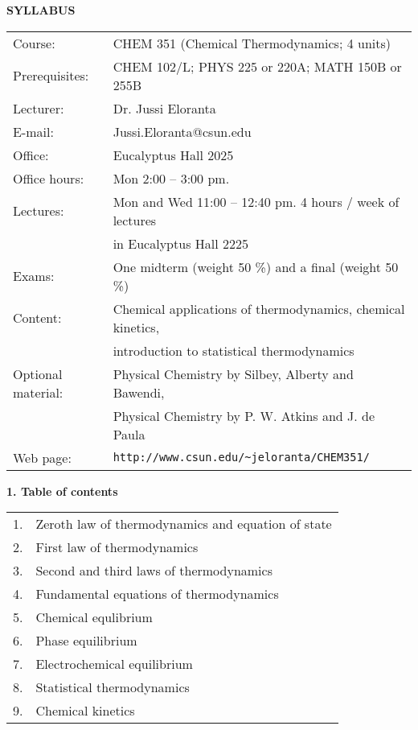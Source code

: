 \documentclass{report}
\begin{document}
\setlength{\parindent}{0pt}
\textbf{SYLLABUS}\\

\begin{tabular}{ll}
Course:   & CHEM 351 (Chemical Thermodynamics; 4 units)\\
Prerequisites: & CHEM 102/L; PHYS 225 or 220A; MATH 150B or 255B\\
Lecturer: & Dr. Jussi Eloranta\\
E-mail:	  & Jussi.Eloranta@csun.edu\\
Office:	  & Eucalyptus Hall 2025\\
Office hours: & Mon 2:00 -- 3:00 pm.\\
Lectures: & Mon and Wed 11:00 -- 12:40 pm. 4 hours / week of lectures\\
          & in Eucalyptus Hall 2225\\
Exams: & One midterm (weight 50 \%) and a final (weight 50 \%)\\
Content: & Chemical applications of thermodynamics, chemical kinetics,\\
         & introduction to statistical thermodynamics\\
Optional material: & Physical Chemistry by Silbey, Alberty and Bawendi,\\
                   & Physical Chemistry by P. W. Atkins and J. de Paula\\
Web page: & \verb+http://www.csun.edu/~jeloranta/CHEM351/+\\
\end{tabular}

\vspace{0.5cm}

\textbf{1. Table of contents}\\

\begin{tabular}{l@{\extracolsep{2cm}}l}
1. & Zeroth law of thermodynamics and equation of state\\
2. & First law of thermodynamics\\
3. & Second and third laws of thermodynamics\\
4. & Fundamental equations of thermodynamics\\
5. & Chemical equlibrium\\
6. & Phase equilibrium\\
7. & Electrochemical equilibrium\\
8. & Statistical thermodynamics\\
9. & Chemical kinetics\\
\end{tabular}
\end{document}
